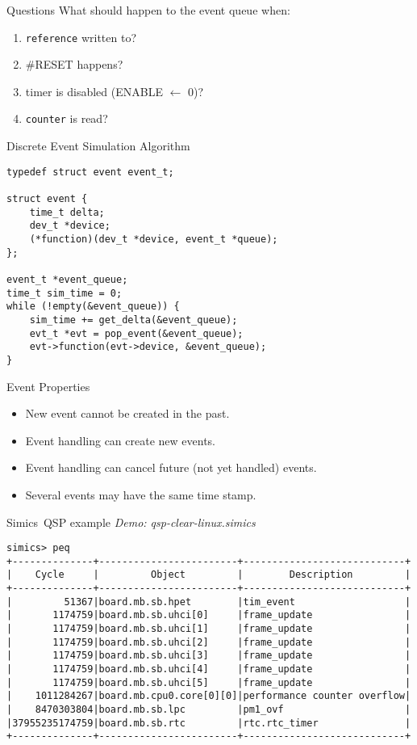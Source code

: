 \begin{frame}{Questions}
What should happen to the event queue when:
\begin{enumerate}
  \item \texttt{reference} written to?\pause
  \item \#RESET happens?\pause
  \item timer is disabled (ENABLE $\leftarrow$ 0)?\pause
  \item \texttt{counter} is read?
\end{enumerate}
\end{frame}

\begin{frame}[fragile]{Discrete Event Simulation Algorithm}
\begin{lstlisting}
typedef struct event event_t;

struct event {
    time_t delta;
    dev_t *device;
    (*function)(dev_t *device, event_t *queue);
};

event_t *event_queue;
time_t sim_time = 0;
while (!empty(&event_queue)) {
    sim_time += get_delta(&event_queue);
    evt_t *evt = pop_event(&event_queue);
    evt->function(evt->device, &event_queue);
}
\end{lstlisting}
\end{frame}

\begin{frame}{Event Properties}
\begin{itemize}
\item New event cannot be created in the past.
\item Event handling can create new events.
\item Event handling can cancel future (not yet handled) events.
\item Several events may have the same time stamp.
\end{itemize}
\end{frame}

\begin{frame}[fragile]{Simics\reg~QSP example}
\emph{Demo: qsp-clear-linux.simics}
\footnotesize{\begin{verbatim}
simics> peq
+--------------+------------------------+----------------------------+
|    Cycle     |         Object         |        Description         |
+--------------+------------------------+----------------------------+
|         51367|board.mb.sb.hpet        |tim_event                   |
|       1174759|board.mb.sb.uhci[0]     |frame_update                |
|       1174759|board.mb.sb.uhci[1]     |frame_update                |
|       1174759|board.mb.sb.uhci[2]     |frame_update                |
|       1174759|board.mb.sb.uhci[3]     |frame_update                |
|       1174759|board.mb.sb.uhci[4]     |frame_update                |
|       1174759|board.mb.sb.uhci[5]     |frame_update                |
|    1011284267|board.mb.cpu0.core[0][0]|performance counter overflow|
|    8470303804|board.mb.sb.lpc         |pm1_ovf                     |
|37955235174759|board.mb.sb.rtc         |rtc.rtc_timer               |
+--------------+------------------------+----------------------------+
\end{verbatim}}
\end{frame}

